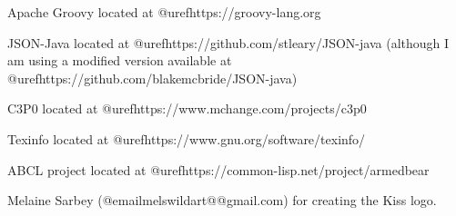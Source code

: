 Apache Groovy located at @uref{https://groovy-lang.org}

JSON-Java located at @uref{https://github.com/stleary/JSON-java}
(although I am using a modified version available at
@uref{https://github.com/blakemcbride/JSON-java})

C3P0 located at @uref{https://www.mchange.com/projects/c3p0}

Texinfo located at @uref{https://www.gnu.org/software/texinfo/}

ABCL project located at @uref{https://common-lisp.net/project/armedbear}

Melaine Sarbey (@email{melswildart@@gmail.com}) for creating the Kiss logo.

